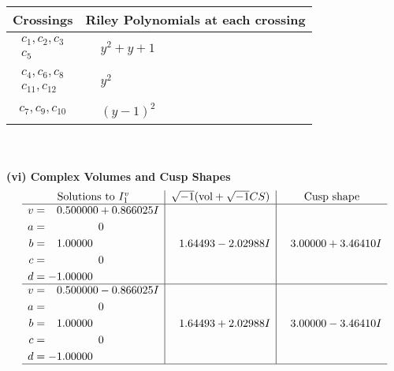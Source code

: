 \documentclass[1p]{elsarticle_modified}
\theoremstyle{definition}
\newcommand{\I}{\sqrt{-1}}
\begin{document}
\begin{tabular}{m{50pt}|m{274pt}}
Crossings & \hspace{64pt}Riley Polynomials at each crossing \\
\hline $$\begin{aligned}c_{1},c_{2},c_{3}\\c_{5}\end{aligned}$$&$\begin{aligned}
&y^2+y+1
\end{aligned}$\\
\hline $$\begin{aligned}c_{4},c_{6},c_{8}\\c_{11},c_{12}\end{aligned}$$&$\begin{aligned}
&y^2
\end{aligned}$\\
\hline $$\begin{aligned}c_{7},c_{9},c_{10}\end{aligned}$$&$\begin{aligned}
&(y-1)^2
\end{aligned}$\\
\hline
\end{tabular}\\~\\
\newpage\flushleft \textbf{(vi) Complex Volumes and Cusp Shapes}
$$\begin{array}{c|c|c}  
\text{Solutions to }I^v_{1}& \I (\text{vol} + \sqrt{-1}CS) & \text{Cusp shape}\\
 \hline 
\begin{aligned}
v &= \phantom{-}0.500000 + 0.866025 I \\
a &= \phantom{-0.000000 } 0 \\
b &= \phantom{-}1.00000\phantom{ +0.000000I} \\
c &= \phantom{-0.000000 } 0 \\
d &= -1.00000\phantom{ +0.000000I}\end{aligned}
 & \phantom{-}1.64493 - 2.02988 I & \phantom{-}3.00000 + 3.46410 I \\ \hline\begin{aligned}
v &= \phantom{-}0.500000 - 0.866025 I \\
a &= \phantom{-0.000000 } 0 \\
b &= \phantom{-}1.00000\phantom{ +0.000000I} \\
c &= \phantom{-0.000000 } 0 \\
d &= -1.00000\phantom{ +0.000000I}\end{aligned}
 & \phantom{-}1.64493 + 2.02988 I & \phantom{-}3.00000 - 3.46410 I\\
 \hline 
 \end{array}$$\newpage\newpage\renewcommand{\arraystretch}{1}
\end{document}
